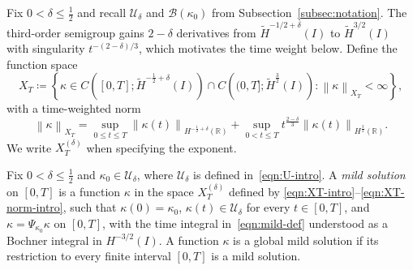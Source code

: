 \documentclass[11pt,reqno]{amsart}
\theoremstyle{plain}
\theoremstyle{definition}
\numberwithin{equation}{section}
\newcommand{\paren}[1]{\left(#1\right)}
\newcommand{\mc}[1]{\mathcal{#1}}
\newcommand{\wt}[1]{\widetilde{#1}}
\newcommand{\norm}[1]{\left\lVert #1 \right\rVert}
\newcommand{\R}{\mathbb{R}}
\newcommand{\thi}[1]{\wt H^{#1}(I)}
\newcommand{\hr}[1]{H^{#1}(\R)}
\begin{document}
Fix $0<\delta\le\frac12$ and recall $\mc U_\delta$
and $\mc B(\kappa_0)$ from
Subsection~\ref{subsec:notation}. The third-order semigroup gains
$2-\delta$ derivatives from $\thi{-1/2+\delta}$ to $\thi{3/2}$ with
singularity $t^{-(2-\delta)/3}$, which motivates the time weight below.
Define the function space
\begin{equation}\label{eqn:XT-intro}
    X_T
    \coloneqq
    \left\{
    \kappa\in C\paren{[0,T];\thi{-\frac12+\delta}}
    \cap C\paren{(0,T];\thi{\frac32}}:
    \norm{\kappa}_{X_T}<\infty
    \right\},
\end{equation}
with a time-weighted norm
\begin{equation}\label{eqn:XT-norm-intro}
    \norm{\kappa}_{X_T}
    =
    \sup_{0\le t\le T}
    \norm{\kappa(t)}_{\hr{-\frac12+\delta}}
    +
    \sup_{0<t\le T}
    t^{\frac{2-\delta}{3}}
    \norm{\kappa(t)}_{\hr{\frac32}}.
\end{equation}
We write $X_T^{(\delta)}$ when specifying the exponent.

Fix $0<\delta\le\frac12$ and $\kappa_0\in\mc U_\delta$, where
$\mc U_\delta$ is defined in~\eqref{eqn:U-intro}.
A \emph{mild solution} on $[0,T]$ is a function $\kappa$ in the space
$X_T^{(\delta)}$ defined by
\eqref{eqn:XT-intro}--\eqref{eqn:XT-norm-intro}, such that
$\kappa(0)=\kappa_0$, $\kappa(t)\in\mc U_\delta$ for every $t\in[0,T]$,
and $\kappa=\Psi_{\kappa_0}\kappa$ on $[0,T]$, with the time integral
in~\eqref{eqn:mild-def} understood as a Bochner integral in $H^{-3/2}(I)$.
A function $\kappa$ is a global mild solution if its restriction to every
finite interval $[0,T]$ is a mild solution.
\end{document}
